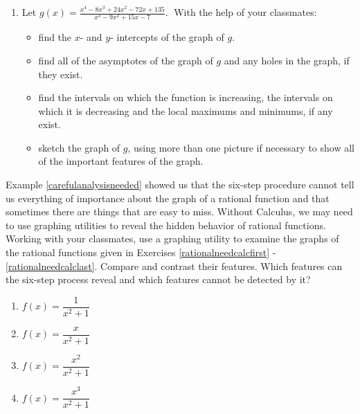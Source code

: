 \documentclass{ximera}
\begin{document}
\begin{enumerate}
\setcounter{enumi}{\value{HW}}


\item Let $g(x) = \displaystyle \frac{x^{4} - 8x^{3} + 24x^{2} - 72x + 135}{x^{3} - 9x^{2} + 15x - 7}.\;$  With the help of your classmates:

\begin{itemize}

\item  find the $x$- and $y$- intercepts of the graph of $g$.

\item   find all of the asymptotes of the graph of $g$ and any holes in the graph, if they exist.

\item find the intervals on which the function is increasing, the intervals on which it is decreasing and the local maximums and minimums, if any exist.

\item sketch the graph of $g$, using more than one picture if necessary to show all of the important features of the graph.

\end{itemize}

\setcounter{HW}{\value{enumi}}
\end{enumerate}

Example \ref{carefulanalysisneeded} showed us that the six-step procedure cannot tell us everything of importance about the graph of a rational function and that sometimes there are things that are easy to miss.  Without Calculus, we may need to use graphing utilities to reveal the hidden behavior of rational functions.  Working with your classmates, use a graphing utility to examine the graphs of the rational functions given in Exercises \ref{rationalneedcalcfirst} - \ref{rationalneedcalclast}.  Compare and contrast their features.  Which features can the six-step process reveal and which features cannot be detected by it?

\begin{multicols}{4}
\begin{enumerate}
\setcounter{enumi}{\value{HW}}

\item $f(x) = \dfrac{1}{x^{2} + 1}$   \label{rationalneedcalcfirst}
\item $f(x) = \dfrac{x}{x^{2} + 1}$ 
\item $f(x) = \dfrac{x^{2}}{x^{2} + 1}$ 
\item $f(x) = \dfrac{x^{3}}{x^{2} + 1}$  \label{rationalneedcalclast}

\setcounter{HW}{\value{enumi}}
\end{enumerate}
\end{multicols}
\end{document}
